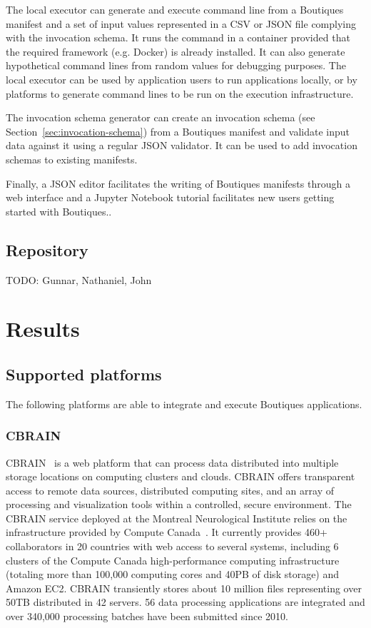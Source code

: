 \documentclass{article}
\newcommand{\todo}[1]{\color{red}TODO: #1\color{black}}
\newcommand{\boutiques}{Boutiques\xspace}
\begin{document}
The local executor can generate and execute command line from a
Boutiques manifest and a set of input values represented in a CSV or
JSON file complying with the invocation schema. It runs the command in
a container provided that the required framework (e.g. Docker) is
already installed. It can also generate hypothetical command lines
from random values for debugging purposes. The local executor can be
used by application users to run applications locally, or by platforms
to generate command lines to be run on the execution infrastructure.

The invocation schema generator can create an invocation schema (see
Section~\ref{sec:invocation-schema}) from a \boutiques manifest and
validate input data against it using a regular JSON validator. It can
be used to add invocation schemas to existing manifests.

Finally, a JSON editor facilitates the writing of \boutiques manifests
through a web interface and a Jupyter Notebook tutorial facilitates
new users getting started with Boutiques..

\subsection{Repository}

\todo{Gunnar, Nathaniel, John}

\section{Results}
\label{sec:results}

\subsection{Supported platforms}

The following platforms are able to integrate and execute Boutiques
applications. 

\subsubsection{CBRAIN}

CBRAIN~\cite{SHER-14} is a web platform that can process data
distributed into multiple storage locations on computing clusters and
clouds. CBRAIN offers transparent access to remote data sources,
distributed computing sites, and an array of processing and
visualization tools within a controlled, secure environment.  The
CBRAIN service deployed at the Montreal Neurological Institute relies
on the infrastructure provided by Compute Canada~\cite{das2016mni}. It
currently provides 460+ collaborators in 20 countries with web access
to several systems, including 6 clusters of the Compute Canada
high-performance computing infrastructure (totaling more than 100,000
computing cores and 40PB of disk storage) and Amazon EC2. CBRAIN
transiently stores about 10 million files representing over 50TB
distributed in 42 servers. 56 data processing applications are integrated and
over 340,000 processing batches have been submitted since 2010.
\end{document}
